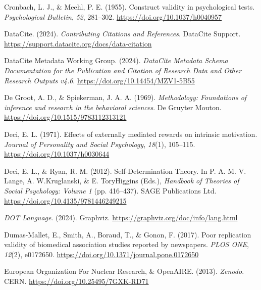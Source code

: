 \documentclass[
  man, noextraspace,floatsintext]{apa7}
\newlength{\cslhangindent}
\newenvironment{CSLReferences}[2] %
 {\begin{list}{}{%
  \setlength{\itemindent}{0pt}
  \setlength{\leftmargin}{0pt}
  \setlength{\parsep}{0pt}
  \ifodd #1
   \setlength{\leftmargin}{\cslhangindent}
   \setlength{\itemindent}{-1\cslhangindent}
  \fi
  \setlength{\itemsep}{#2\baselineskip}}}
 {\end{list}}
\begin{document}
\begin{CSLReferences}{1}{0}
Cronbach, L. J., \& Meehl, P. E. (1955). Construct validity in psychological tests. \emph{Psychological Bulletin}, \emph{52}, 281--302. \url{https://doi.org/10.1037/h0040957}

DataCite. (2024). \emph{Contributing {Citations} and {References}}. DataCite Support. \url{https://support.datacite.org/docs/data-citation}

DataCite Metadata Working Group. (2024). \emph{{DataCite Metadata Schema Documentation} for the {Publication} and {Citation} of {Research Data} and {Other Research Outputs} v4.6}. \url{https://doi.org/10.14454/MZV1-5B55}

De Groot, A. D., \& Spiekerman, J. A. A. (1969). \emph{Methodology: {Foundations} of inference and research in the behavioral sciences}. De Gruyter Mouton. \url{https://doi.org/10.1515/9783112313121}

Deci, E. L. (1971). Effects of externally mediated rewards on intrinsic motivation. \emph{Journal of Personality and Social Psychology}, \emph{18}(1), 105--115. \url{https://doi.org/10.1037/h0030644}

Deci, E. L., \& Ryan, R. M. (2012). Self-{Determination Theory}. In P. A. M. V. Lange, A. W.Kruglanski, \& E. ToryHiggins (Eds.), \emph{Handbook of {Theories} of {Social Psychology}: {Volume} 1} (pp. 416--437). SAGE Publications Ltd. \url{https://doi.org/10.4135/9781446249215}

\emph{{DOT Language}}. (2024). Graphviz. \url{https://graphviz.org/doc/info/lang.html}

Dumas-Mallet, E., Smith, A., Boraud, T., \& Gonon, F. (2017). Poor replication validity of biomedical association studies reported by newspapers. \emph{PLOS ONE}, \emph{12}(2), e0172650. \url{https://doi.org/10.1371/journal.pone.0172650}

European Organization For Nuclear Research, \& OpenAIRE. (2013). \emph{Zenodo}. CERN. \url{https://doi.org/10.25495/7GXK-RD71}


\end{CSLReferences}
\end{document}
